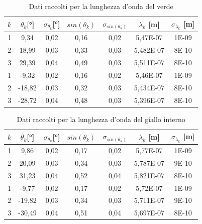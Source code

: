 \documentclass{article}
\begin{document}
        \begin{table}[H]

            \centering

            \begin{tabular}{c c c c c c c}

                \toprule 
                $k$ & $\theta_k$[°] & $\sigma_{\theta_k}$[°] & $sin(\theta_k)$ & $\sigma_{sin(\theta_k)}$ & $\lambda_k$ [m] & $\sigma_{\lambda_k}$ [m] \\
                
                \midrule
                1	&	9,34	&	0,02	&	0,16	&	0,02	&	5,47E-07	&	1E-09\\
                2	&	18,99	&	0,03	&	0,33	&	0,03	&	5,482E-07	&	8E-10\\
                3	&	29,39	&	0,04	&	0,49	&	0,03	&	5,511E-07	&	8E-10\\
                1	&	-9,32	&	0,02	&	0,16	&	0,02	&	5,46E-07	&	1E-09\\
                2	&	-18,82	&	0,03	&	0,32	&	0,03	&	5,434E-07	&	8E-10\\
                3	&	-28,72	&	0,04	&	0,48	&	0,03	&	5,396E-07	&	8E-10\\
                \bottomrule

            \end{tabular}

            \caption{Dati raccolti per la lunghezza d'onda del verde}
            
        \end{table}
        \label{table:verde}

        \begin{table}[H]

            \centering

            \begin{tabular}{c c c c c c c}
                \toprule 
                $k$ & $\theta_k$[°] & $\sigma_{\theta_k}$[°] & $sin(\theta_k)$ & $\sigma_{sin(\theta_k)}$ & $\lambda_k$ [m] & $\sigma_{\lambda_k}$ [m] \\
                
                \midrule
                1	&	9,86	&	0,02	&	0,17	&	0,02	&	5,77E-07	&	1E-09\\
                2	&	20,09	&	0,03	&	0,34	&	0,03	&	5,787E-07	&	9E-10\\
                3	&	31,23	&	0,04	&	0,52	&	0,04	&	5,821E-07	&	8E-10\\
                1	&	-9,77	&	0,02	&	0,17	&	0,02	&	5,72E-07	&	1E-09\\
                2	&	-19,82	&	0,03	&	0,34	&	0,03	&	5,711E-07	&	9E-10\\
                3	&	-30,49	&	0,04	&	0,51	&	0,04	&	5,697E-07	&	8E-10\\
                \bottomrule

            \end{tabular}

            \caption{Dati raccolti per la lunghezza d'onda del giallo interno}
            
        \end{table}
        \label{table:giallo int}
\end{document}
